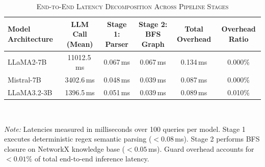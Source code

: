 \begin{table}[t]
\centering
\caption{\textsc{End-to-End Latency Decomposition Across Pipeline Stages}}
\label{tab:latency_breakdown}
\begin{tabular}{lccccc}
  \toprule
  \textbf{Model Architecture} & \textbf{LLM Call (Mean)} & \textbf{Stage 1: Parser} & \textbf{Stage 2: BFS Graph} & \textbf{Total Overhead} & \textbf{Overhead Ratio} \\
  \midrule
  LLaMA2-7B & 11012.5\,ms & 0.067\,ms & 0.067\,ms & 0.134\,ms & 0.000\% \\
  Mistral-7B & 3402.6\,ms & 0.048\,ms & 0.039\,ms & 0.087\,ms & 0.000\% \\
  LLaMA3.2-3B & 1396.5\,ms & 0.051\,ms & 0.039\,ms & 0.089\,ms & 0.010\% \\
  \bottomrule
\end{tabular}
\vspace{1mm}
\\[-1mm]
\raggedright
\footnotesize{\textit{Note:} Latencies measured in milliseconds over 100 queries per model. Stage 1 executes deterministic regex semantic parsing ($<0.08\,$ms). Stage 2 performs BFS closure on NetworkX knowledge base ($<0.05\,$ms). Guard overhead accounts for $<0.01\%$ of total end-to-end inference latency.}
\end{table}
